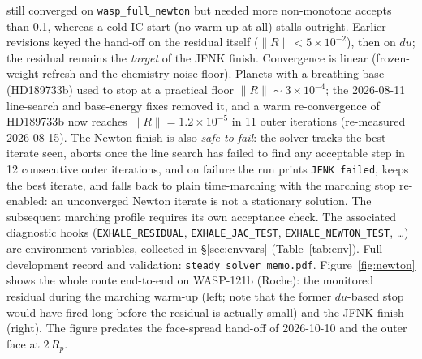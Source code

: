 \documentclass[english,a4paper]{my_memo}
\begin{document}
still converged on \texttt{wasp\_full\_newton} but needed more non-monotone
accepts than 0.1, whereas a cold-IC start (no warm-up at all) stalls outright.
Earlier revisions keyed the hand-off on the residual itself
($\|R\|<5\times10^{-2}$), then on $du$; the residual remains the
\emph{target} of the JFNK finish. Convergence is linear (frozen-weight refresh
and the chemistry noise floor). Planets with a breathing base (HD189733b) used
to stop at a practical floor $\|R\|\sim3\times10^{-4}$; the 2026-08-11
line-search and base-energy fixes removed it, and a warm re-convergence of
HD189733b now reaches $\|R\|=1.2\times10^{-5}$ in 11 outer iterations
(re-measured 2026-08-15).
The Newton finish is also \emph{safe to fail}: the solver tracks the best
iterate seen, aborts once the line search has failed to find any acceptable
step in 12 consecutive outer iterations, and on failure the run prints
\texttt{JFNK failed}, keeps the best
iterate, and falls back to plain time-marching with the marching stop
re-enabled: an unconverged Newton iterate is not a stationary
solution. The subsequent marching profile requires its own acceptance check. The associated diagnostic hooks (\texttt{EXHALE\_RESIDUAL},
\texttt{EXHALE\_JAC\_TEST}, \texttt{EXHALE\_NEWTON\_TEST}, \ldots) are environment
variables, collected in \S\ref{sec:envvars} (Table~\ref{tab:env}). Full
development record and validation: \texttt{steady\_solver\_memo.pdf}.
Figure~\ref{fig:newton} shows the whole route end-to-end on WASP-121b
(Roche): the monitored residual during the marching warm-up (left; note that the
former $du$-based stop would have fired long before the residual is actually
small) and the JFNK finish (right). The figure predates the face-spread
hand-off of 2026-10-10 and the outer face at $2\,R_p$.
\end{document}
